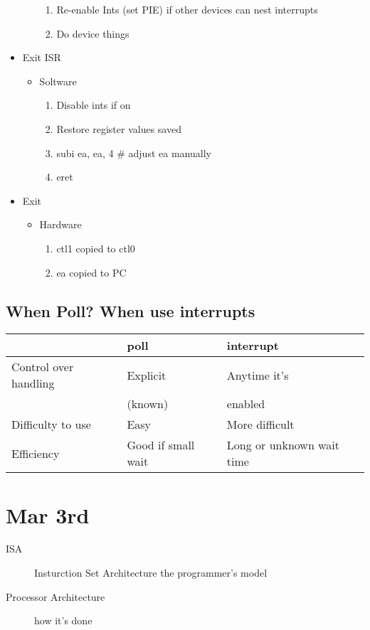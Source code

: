 \documentclass[11pt]{article}
\begin{document}
\begin{itemize}
\begin{itemize}
\begin{enumerate}
\item Re-enable Ints (set PIE) if other devices can nest interrupts
\item Do device things
\end{enumerate}
\end{itemize}
\item Exit ISR
\begin{itemize}
\item Soltware
\begin{enumerate}
\item Disable ints if on
\item Restore register values saved
\item subi ea, ea, 4 \# adjust ea manually
\item eret
\end{enumerate}
\end{itemize}
\item Exit
\begin{itemize}
\item Hardware
\begin{enumerate}
\item ctl1 copied to ctl0
\item ea copied to PC
\end{enumerate}
\end{itemize}
\end{itemize}
\subsection{When Poll? When use interrupts}
\label{sec:orgheadline79}
\begin{center}
\begin{tabular}{lll}
 & poll & interrupt\\
\hline
Control over handling & Explicit & Anytime it's\\
 & (known) & enabled\\
\hline
Difficulty to use & Easy & More difficult\\
\hline
Efficiency & Good if small wait & Long or unknown wait time\\
\end{tabular}
\end{center}
\section{Mar 3rd}
\label{sec:orgheadline84}
\begin{description}
\item[{ISA}] Insturction Set Architecture the programmer's model
\item[{Processor Architecture}] how it's done
\end{description}
\end{document}
